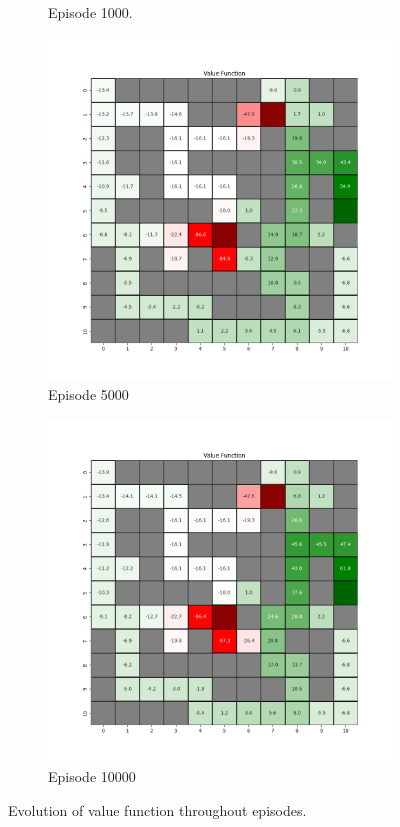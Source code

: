 \documentclass{assignment}
\begin{document}
\begin{figure}[H]
\begin{subfigure}{0.3\textwidth}
    \caption{Episode 1000.}
    \end{subfigure}\hfill
    \begin{subfigure}{0.3\textwidth}
        \includegraphics[width=\textwidth]{figures/value_td/epsilon_sweep/value_function_alpha_0.1_gamma_0.95_epsilon_0.0_iteration_5000.png}
    \caption{Episode 5000}
    \end{subfigure}\hfill
    \begin{subfigure}{0.3\textwidth}
        \includegraphics[width=\textwidth]{figures/value_td/epsilon_sweep/value_function_alpha_0.1_gamma_0.95_epsilon_0.0_iteration_10000.png}
    \caption{Episode 10000}
    \end{subfigure}
    \caption{Evolution of value function throughout episodes.}
    \label{fig:epsilon_0.0_td_learning_value}
\end{figure}
\end{document}
